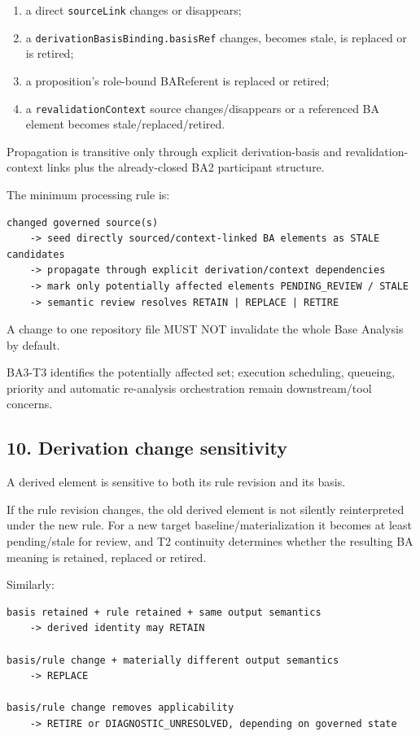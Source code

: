 \documentclass[11pt,a4paper]{article}
\providecommand{\tightlist}{\setlength{\itemsep}{0pt}\setlength{\parskip}{0pt}}
\begin{document}
\begin{enumerate}
\def\labelenumi{\arabic{enumi}.}
\tightlist
\item
  a direct \texttt{sourceLink} changes or disappears;
\item
  a \texttt{derivationBasisBinding.basisRef} changes, becomes stale, is
  replaced or is retired;
\item
  a proposition's role-bound BAReferent is replaced or retired;
\item
  a \texttt{revalidationContext} source changes/disappears or a
  referenced BA element becomes stale/replaced/retired.
\end{enumerate}

Propagation is transitive only through explicit derivation-basis and
revalidation-context links plus the already-closed BA2 participant
structure.

The minimum processing rule is:

\begin{verbatim}
changed governed source(s)
    -> seed directly sourced/context-linked BA elements as STALE candidates
    -> propagate through explicit derivation/context dependencies
    -> mark only potentially affected elements PENDING_REVIEW / STALE
    -> semantic review resolves RETAIN | REPLACE | RETIRE
\end{verbatim}

A change to one repository file MUST NOT invalidate the whole Base
Analysis by default.

BA3-T3 identifies the potentially affected set; execution scheduling,
queueing, priority and automatic re-analysis orchestration remain
downstream/tool concerns.

\subsection{10. Derivation change
sensitivity}\label{derivation-change-sensitivity}

A derived element is sensitive to both its rule revision and its basis.

If the rule revision changes, the old derived element is not silently
reinterpreted under the new rule. For a new target
baseline/materialization it becomes at least pending/stale for review,
and T2 continuity determines whether the resulting BA meaning is
retained, replaced or retired.

Similarly:

\begin{verbatim}
basis retained + rule retained + same output semantics
    -> derived identity may RETAIN

basis/rule change + materially different output semantics
    -> REPLACE

basis/rule change removes applicability
    -> RETIRE or DIAGNOSTIC_UNRESOLVED, depending on governed state
\end{verbatim}
\end{document}
